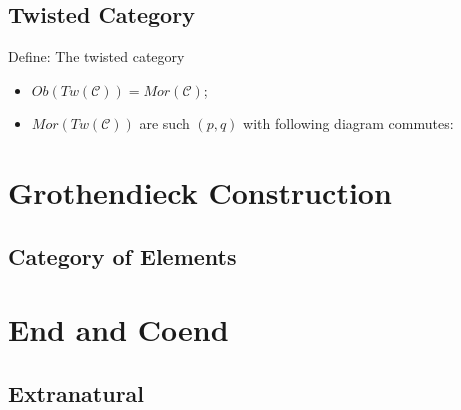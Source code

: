 \documentclass[Total.tex]{subfiles}
\begin{document}
			\subsection{Twisted Category}
			\begin{Def}
				Define: The twisted category
				\begin{itemize}
					\item $Ob(Tw(\mathcal{C}))=Mor(\mathcal{C})$;
					\item $Mor(Tw(\mathcal{C}))$ are such $(p,q)$ with following diagram commutes:
					\begin{center}
					\end{center}
				\end{itemize}
			\end{Def}
		\section{Grothendieck Construction}
			\subsection{Category of Elements}
		\section{End and Coend}
			\subsection{Extranatural}
				
\end{document}
